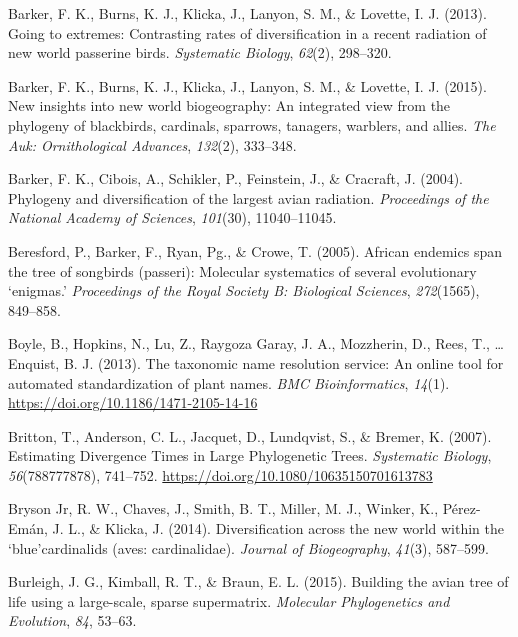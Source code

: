 \documentclass[
  english,
  man]{apa6}
\newlength{\cslhangindent}
\newlength{\cslentryspacingunit} %
\newenvironment{CSLReferences}[2] %
 {%
  \setlength{\parindent}{0pt}
  \ifodd #1
  \let\oldpar\par
  \def\par{\hangindent=\cslhangindent\oldpar}
  \fi
  \setlength{\parskip}{#2\cslentryspacingunit}
 }%
 {}
\begin{document}
\begin{CSLReferences}{1}{0}
\leavevmode{}%
Barker, F. K., Burns, K. J., Klicka, J., Lanyon, S. M., \& Lovette, I. J. (2013). Going to extremes: Contrasting rates of diversification in a recent radiation of new world passerine birds. \emph{{Systematic Biology}}, \emph{62}(2), 298--320.

\leavevmode{}%
Barker, F. K., Burns, K. J., Klicka, J., Lanyon, S. M., \& Lovette, I. J. (2015). New insights into new world biogeography: An integrated view from the phylogeny of blackbirds, cardinals, sparrows, tanagers, warblers, and allies. \emph{The Auk: Ornithological Advances}, \emph{132}(2), 333--348.

\leavevmode{}%
Barker, F. K., Cibois, A., Schikler, P., Feinstein, J., \& Cracraft, J. (2004). Phylogeny and diversification of the largest avian radiation. \emph{Proceedings of the National Academy of Sciences}, \emph{101}(30), 11040--11045.

\leavevmode{}%
Beresford, P., Barker, F., Ryan, Pg., \& Crowe, T. (2005). African endemics span the tree of songbirds (passeri): Molecular systematics of several evolutionary {`enigmas.'} \emph{Proceedings of the Royal Society B: Biological Sciences}, \emph{272}(1565), 849--858.

\leavevmode{}%
Boyle, B., Hopkins, N., Lu, Z., Raygoza Garay, J. A., Mozzherin, D., Rees, T., \ldots{} Enquist, B. J. (2013). {The taxonomic name resolution service: An online tool for automated standardization of plant names}. \emph{{BMC Bioinformatics}}, \emph{14}(1). \url{https://doi.org/10.1186/1471-2105-14-16}

\leavevmode{}%
Britton, T., Anderson, C. L., Jacquet, D., Lundqvist, S., \& Bremer, K. (2007). {Estimating Divergence Times in Large Phylogenetic Trees}. \emph{{Systematic Biology}}, \emph{56}(788777878), 741--752. \url{https://doi.org/10.1080/10635150701613783}

\leavevmode{}%
Bryson Jr, R. W., Chaves, J., Smith, B. T., Miller, M. J., Winker, K., Pérez-Emán, J. L., \& Klicka, J. (2014). Diversification across the new world within the `blue'cardinalids (aves: cardinalidae). \emph{Journal of Biogeography}, \emph{41}(3), 587--599.

\leavevmode{}%
Burleigh, J. G., Kimball, R. T., \& Braun, E. L. (2015). Building the avian tree of life using a large-scale, sparse supermatrix. \emph{Molecular Phylogenetics and Evolution}, \emph{84}, 53--63.


\end{CSLReferences}
\end{document}
